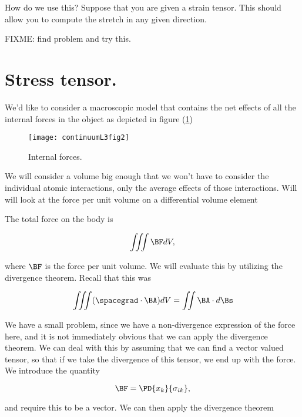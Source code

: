 How do we use this?  Suppose that you are given a strain tensor.  This should allow you to compute the stretch in any given direction.

FIXME: find problem and try this.

\section{Stress tensor.}

We'd like to consider a macroscopic model that contains the net effects of all the internal forces in the object as depicted in figure (\ref{fig:continuumL3:continuumL3fig2})

\begin{figure}[htp]
   \centering
   \texttt{[image: continuumL3fig2]}
   \caption{Internal forces.}\label{fig:continuumL3:continuumL3fig2}
\end{figure}

We will consider a volume big enough that we won't have to consider the individual atomic interactions, only the average effects of those interactions.  Will will look at the force per unit volume on a differential volume element

The total force on the body is 

\begin{equation}\label{eqn:continuumL3:230}
\iiint \BF dV,
\end{equation}

where $\BF$ is the force per unit volume.  We will evaluate this by utilizing the divergence theorem.  Recall that this was

\begin{equation}\label{eqn:continuumL3:250}
\iiint (\spacegrad \cdot \BA) dV
= \iint \BA \cdot d\Bs
\end{equation}

We have a small problem, since we have a non-divergence expression of the force here, and it is not immediately obvious that we can apply the divergence theorem.  We can deal with this by assuming that we can find a vector valued tensor, so that if we take the divergence of this tensor, we end up with the force.  We introduce the quantity

\begin{equation}\label{eqn:continuumL3:270}
\BF = \PD{x_k}{\sigma_{ik}},
\end{equation}

and require this to be a vector.  We can then apply the divergence theorem

